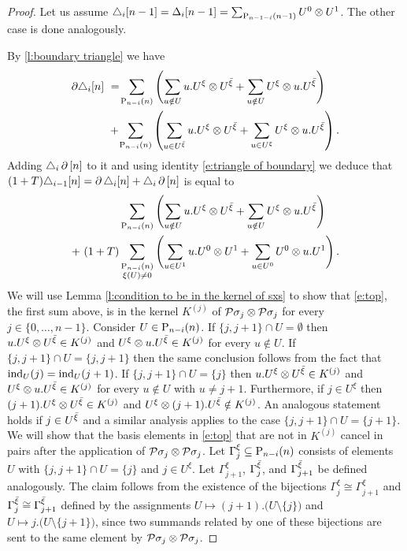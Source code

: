 \begin{proof}
	Let us assume $\triangle_i [n-1] = \Delta_i [n-1] = \sum_{\P_{n-1-i}(n-1)} U^0 \ot U^1$.
	The other case is done analogously.

	By \cref{l:boundary triangle} we have
    \begin{align*}
    \partial \triangle_i [n]\ & =\! \sum_{\P_{n-i}(n)} \left(\sum_{u \notin U} {u.U^\xi} \ot {U^\barxi} +
    \sum_{u \notin U} {U^\xi} \ot {u.U^\barxi} \right) \\ & +\!
    \sum_{\P_{n-i}(n)} \left(\sum_{u \in U^\barxi} {u.U^\xi} \ot {U^\barxi} +
    \sum_{u \in U^{\xi}} {U^\xi} \ot {u.U^\barxi} \right).
    \end{align*}
    Adding $\triangle_i \bd \, [n]$ to it and using identity \eqref{e:triangle of boundary} we deduce that $(1+T) \triangle_{i-1} [n] = \bd \triangle_i [n] + \triangle_i \bd \, [n]$ is equal to
    \begin{align}
    \label{e:top} & \sum_{\P_{n-i}(n)} \left(\sum_{u \notin U} u.U^\xi \ot U^\barxi +
    \sum_{u \notin U} U^\xi \ot u.U^\barxi \right) \\ +\
    \label{e:bottom} (1+T) & \sum_{\substack{\P_{n-i}(n) \\ \xi(U) \neq 0}} \left(\sum_{u \in U^1} {u.U^0} \ot {U^1} +
    \sum_{u \in U^0} {U^0} \ot {u.U^1} \right).
    \end{align}
    We will use Lemma \ref{l:condition to be in the kernel of sxs} to show that \eqref{e:top}, the first sum above, is in the kernel $K^{(j)}$ of $\cP \sigma_j \ot \cP \sigma_j$ for every $j \in \{0, \dots, n-1\}$.
    Consider $U \in \P_{n-i}(n)$.
    If $\{j, j+1\} \cap U = \emptyset$ then $u.U^\xi \ot U^\barxi \in K^{(j)}$ and $U^\xi \ot u.U^\barxi \in K^{(j)}$ for every $u \notin U$.
    If $\{j, j+1\} \cap U = \{j, j+1\}$ then the same conclusion follows from the fact that $\ind_U(j) = \ind_U(j+1)$.
    If $\{j, j+1\} \cap U = \{j\}$ then $u.U^\xi \ot U^\barxi \in K^{(j)}$ and $U^\xi \ot u.U^\barxi \in K^{(j)}$ for every $u \notin U$ with $u \neq j+1$.
    Furthermore, if $j \in U^\xi$ then $(j+1).U^\xi \ot U^\barxi \in K^{(j)}$ and $U^\xi \ot (j+1).U^\barxi \notin K^{(j)}$.
    An analogous statement holds if $j \in U^\barxi$ and a similar analysis applies to the case $\{j, j+1\} \cap U = \{j+1\}$.
    We will show that the basis elements in \eqref{e:top} that are not in $K^{(j)}$ cancel in pairs after the application of $\cP\sigma_j \ot \cP\sigma_j$.
    Let $\Gamma_j^\xi \subseteq \P_{n-i}(n)$ consists of elements $U$ with $\{j, j+1\} \cap U = \{j\}$ and $j \in U^\xi$.
    Let $\Gamma_{j+1}^\xi$, $\Gamma_j^\barxi$, and $\Gamma_{j+1}^\barxi$ be defined analogously.
    The claim follows from the existence of the bijections $\Gamma_{j}^\xi \cong \Gamma_{j+1}^\xi$ and $\Gamma_{j}^\barxi \cong \Gamma_{j+1}^\barxi$ defined by the assignments $U \mapsto (j+1).\big( U \setminus \{j\} \big)$ and $U \mapsto j.\big( U \setminus \{j+1\} \big)$, since two summands related by one of these bijections are sent to the same element by $\cP\sigma_j \ot \cP\sigma_j$.


\end{proof}
